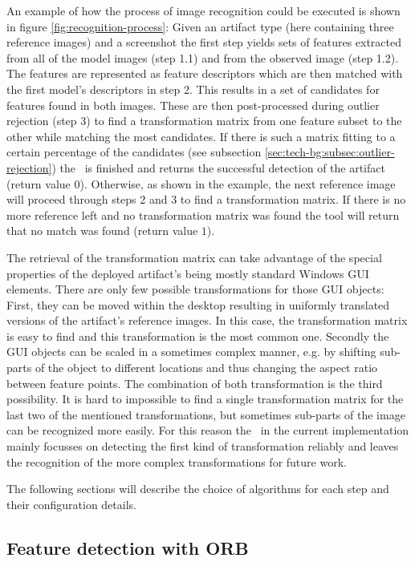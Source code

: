 An example of how the process of image recognition could be executed is shown in figure \ref{fig:recognition-process}: Given an artifact type (here containing three reference images) and a screenshot the first step yields sets of features extracted from all of the model images (step 1.1) and from the observed image (step 1.2). The features are represented as feature descriptors which are then matched with the first model's descriptors in step 2. This results in a set of candidates for features found in both images. These are then post-processed during outlier rejection (step 3) to find a transformation matrix from one feature subset to the other while matching the most candidates. If there is such a matrix fitting to a certain percentage of the candidates (see subsection \ref{sec:tech-bg:subsec:outlier-rejection}) the \vd~is finished and returns the successful detection of the artifact (return value $0$). Otherwise, as shown in the example, the next reference image will proceed through steps 2 and 3 to find a transformation matrix. If there is no more reference left and no transformation matrix was found the tool will return that no match was found (return value $1$).

The retrieval of the transformation matrix can take advantage of the special properties of the deployed artifact's being mostly standard Windows GUI elements. There are only few possible transformations for those GUI objects: First, they can be moved within the desktop resulting in uniformly translated versions of the artifact's reference images. In this case, the transformation matrix is easy to find and this transformation is the most common one. Secondly the GUI objects can be scaled in a sometimes complex manner, e.g. by shifting sub-parts of the object to different locations and thus changing the aspect ratio between feature points. The combination of both transformation is the third possibility. It is hard to impossible to find a single transformation matrix for the last two of the mentioned transformations, but sometimes sub-parts of the image can be recognized more easily. For this reason the \vd~in the current implementation mainly focusses on detecting the first kind of transformation reliably and leaves the recognition of the more complex transformations for future work.

The following sections will describe the choice of algorithms for each step and their configuration details.

\subsection{Feature detection with ORB}\label{sec:tech-bg:subsec:feature-detection}


